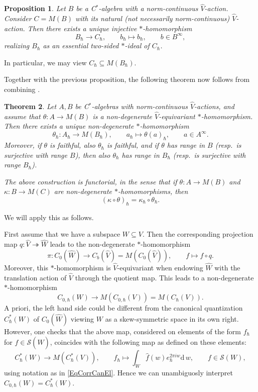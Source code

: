 \documentclass[11pt, reqno]{amsart}
\newtheorem{theorem}{Theorem}[section]
\newtheorem{prop}[theorem]{Proposition}
\theoremstyle{definition}
\numberwithin{equation}{section}
\newcommand{\rd}{\mathrm{d}\!\,}
\begin{document}
\begin{prop}\label{PropExtMultAlg}
Let $B$ be a C$^*$-algebra with a norm-continuous $\hat{V}$-action. Consider $C = M(B)$ with its natural (not necessarily norm-continuous) $\hat{V}$-action. Then there exists a unique injective $*$-homomorphism 
\[
B_{\hbar} \rightarrow C_{\hbar},\qquad b_{\hbar}\mapsto b_{\hbar},\qquad b \in B^{\infty},
\]
realizing $B_{\hbar}$ as an essential two-sided $*$-ideal of $C_{\hbar}$. 
\end{prop}

In particular, we may view $C_{\hbar}\subseteq M(B_{\hbar})$. 

Together with the previous proposition, the following theorem now follows from combining \cite[Theorem 5.7, Proposition 5.8 and Proposition 5.10]{Rie93}.

\begin{theorem}\label{TheoFunctRieffDef}
Let $A,B$ be C$^*$-algebras with norm-continuous $\hat{V}$-actions, and assume that $\theta\colon  A \rightarrow M(B)$ is a non-degenerate $\hat{V}$-equivariant $*$-homomorphism. Then there exists a unique non-degenerate $*$-homomorphism
\[
\theta_{\hbar}\colon A_{\hbar}\rightarrow M(B_{\hbar}),\qquad a_{\hbar} \mapsto \theta(a)_{\hbar},\qquad a\in A^{\infty}. 
\]
Moreover, if $\theta$ is faithful, also $\theta_{\hbar}$ is faithful, and if $\theta$ has range in $B$ (resp.\ is surjective with range $B$), then also $\theta_{\hbar}$ has range in $B_{\hbar}$ (resp.\ is surjective with range $B_{\hbar}$).

The above construction is functorial, in the sense that if $\theta\colon  A \rightarrow M(B)$ and $\kappa\colon  B \rightarrow M(C)$ are non-degenerate $*$-homomorphisms, then 
\[
(\kappa \circ\theta)_{\hbar} = \kappa_{\hbar}\circ \theta_{\hbar}.
\]
\end{theorem}

We will apply this as follows. 

First assume that we have a subspace $W \subseteq V$. Then the corresponding projection map $q\colon  \hat{V}\twoheadrightarrow \hat{W}$ leads to the non-degenerate $*$-homomorphism 
\[
\pi\colon  C_0(\hat{W})\rightarrow C_b(\hat{V}) = M(C_0(\hat{V})),\qquad f\mapsto f\circ q. 
\]
Moreover, this $*$-homomorphism is $\hat{V}$-equivariant when endowing $\hat{W}$ with the translation action of $\hat{V}$ through the quotient map. This leads to a non-degenerate $*$-homomorphism
\[
C_{0,\hbar}(W) \rightarrow M(C_{0,\hbar}(V)) = M(C_{\hbar}(V)). 
\]
A priori, the left hand side could be different from the canonical quantization $C_{\hbar}^*(W)$ of $C_0(\hat{W})$ viewing $W$ as a skew-symmetric space in its own right. However, one checks that the above map, considered on elements of the form $f_{\hbar}$ for $f\in \mathcal{S}(\hat{W})$, coincides with the following map as defined on these elements: 
\[
C_{\hbar}^*(W) \rightarrow M(C^*_{\hbar}(V)),\qquad f_{\hbar} \mapsto \int_{W} \hat{f}(w) e_{\hbar}^{2\pi i w}\rd w, \qquad f\in \mathcal{S}(W),
\]
using notation as in \eqref{EqCorrCanEl}. Hence we can unambiguosly interpret $C_{0,\hbar}(W) = C^*_{\hbar}(W)$. 
\end{document}
